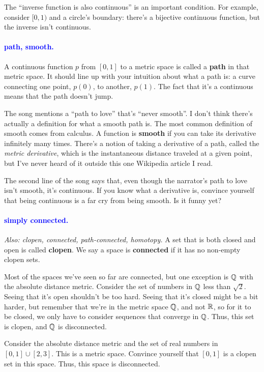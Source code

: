 \documentclass[11pt,paper=letter]{scrartcl}
\renewcommand{\bluebf}[1]{{\bfseries \color{Blue} #1}}
\renewcommand\wp[1]{\paragraph{\textcolor{Blue}{#1.}} \hspace{-1em}}
\newcommand\wl[1]{\label{w:#1}}
\newcommand\oww[1]{\textit{Also: #1.}}
\begin{document}
\begin{remboxed}
  The ``inverse function is also continuous'' is an important condition. For example, consider $[0, 1)$ and a circle's boundary: there's a bijective continuous function, but the inverse isn't continuous.
\end{remboxed}

\wp{path, smooth}
\wl{path}
\wl{smooth}
A continuous function $p$ from $[0, 1]$ to a metric space is called a \bluebf{path} in that metric space. It should line up with your intuition about what a path is: a curve connecting one point, $p(0)$, to another, $p(1)$. The fact that it's a continuous means that the path doesn't jump.

The song mentions a ``path to love'' that's ``never smooth''. I don't think there's actually a definition for what a smooth path is. The most common definition of smooth comes from calculus. A function is \bluebf{smooth} if you can take its derivative infinitely many times. There's a notion of taking a derivative of a path, called the \textit{metric derivative}, which is the instantaneous distance traveled at a given point, but I've never heard of it outside this one Wikipedia article I read.

\begin{exrboxed}
  The second line of the song says that, even though the narrator's path to love isn't smooth, it's continuous. If you know what a derivative is, convince yourself that being continuous is a far cry from being smooth. Is it funny yet?
\end{exrboxed}

\wp{simply connected}
\wl{simply connected}
\oww{clopen, connected, path-connected, homotopy}
A set that is both closed and open is called \textbf{clopen}. We say a space is \textbf{connected} if it has no non-empty clopen sets.

Most of the spaces we've seen so far are connected, but one exception is $\mathbb Q$ with the absolute distance metric. Consider the set of numbers in $\mathbb Q$ less than $\sqrt2$. Seeing that it's open shouldn't be too hard. Seeing that it's closed might be a bit harder, but remember that we're in the metric space $\mathbb Q$, and not $\mathbb R$, so for it to be closed, we only have to consider sequences that converge in $\mathbb Q$. Thus, this set is clopen, and $\mathbb Q$ is disconnected.

\begin{exrboxed}
  Consider the absolute distance metric and the set of real numbers in $[0, 1] \cup [2, 3]$. This is a metric space. Convince yourself that $[0, 1]$ is a clopen set in this space. Thus, this space is disconnected.
\end{exrboxed}
\end{document}

